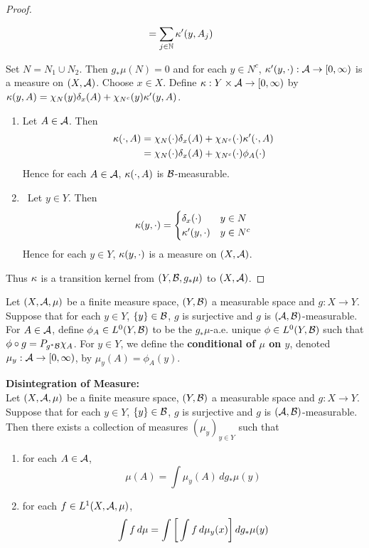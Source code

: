\documentclass{book}
\begin{document}
\begin{proof}
\begin{itemize}
\begin{align*}
				& =  \sum\limits_{j \in \mathbb{N}} \kappa'(y, A_j)
			\end{align*}
		\end{itemize}
		Set $N = N_1 \cup N_2$. Then $g_*\mu(N) = 0$ and for each $y \in N^c$, $\kappa'(y, \cdot): \mathcal{A} \rightarrow [0,\infty)$ is a measure on $(X, \mathcal{A})$. Choose $x \in X$. Define $\kappa: Y \times \mathcal{A} \rightarrow [0,\infty)$ by $\kappa (y, A) = \chi_{N}(y)\delta_{x}(A) + \chi_{N^c}(y)\kappa'(y, A)$. 
		\begin{enumerate}
			\item Let $A \in \mathcal{A}$. Then 
			\begin{align*}
				\kappa(\cdot, A) 
				& = \chi_N(\cdot) \delta_x(A) + \chi_{N^c}(\cdot) \kappa'(\cdot, A) \\ 
				& = \chi_N(\cdot) \delta_x(A) + \chi_{N^c}(\cdot) \phi_A(\cdot) 
			\end{align*}
			Hence for each $A \in \mathcal{A}$, $\kappa(\cdot, A)$ is $\mathcal{B}$-measurable.
			\item \
			Let $y \in Y$. Then 
			\[
			\kappa(y, \cdot) = 
			\begin{cases}
				\delta_x(\cdot) & y \in N \\
				\kappa'(y, \cdot) & y \in N^c \\
			\end{cases}
			\]
			Hence for each $y \in Y$, $\kappa(y, \cdot)$ is a measure on $(X, \mathcal{A})$. 
		\end{enumerate}
		Thus $\kappa$ is a transition kernel from $(Y, \mathcal{B}, g_*\mu)$ to $(X, \mathcal{A})$.
	\end{proof}
	
	\begin{defn}
		Let $(X, \mathcal{A}, \mu)$ be a finite measure space, $(Y, \mathcal{B})$ a measurable space and $g: X \rightarrow Y$. Suppose that for each $y \in Y$, $\{y\} \in \mathcal{B}$, $g$ is surjective and $g$ is $(\mathcal{A}, \mathcal{B})$-measurable. For $A \in \mathcal{A}$, define $\phi_A \in L^0(Y, \mathcal{B} )$ to be the $g_*\mu$-a.e. unique $\phi \in L^0(Y, \mathcal{B})$ such that $\phi \circ g = P_{g^*\mathcal{B}} \chi_A$. For $y \in Y$, we define the \textbf{conditional of $\mu$ on $y$}, denoted $\mu_y : \mathcal{A} \rightarrow [0,\infty)$, by $\mu_y(A) = \phi_A(y)$. 
	\end{defn}
	
	\begin{ex} \textbf{Disintegration of Measure:} \\
		Let $(X, \mathcal{A}, \mu)$ be a finite measure space, $(Y, \mathcal{B})$ a measurable space and $g: X \rightarrow Y$. Suppose that for each $y \in Y$, $\{y\} \in \mathcal{B}$, $g$ is surjective and $g$ is $(\mathcal{A}, \mathcal{B})$-measurable. Then there exists a collection of measures $(\mu_y)_{y \in Y}$ such that  
		\begin{enumerate}
			\item for each $A \in \mathcal{A}$, 
			$$\mu(A) = \int \mu_y(A) \, d g_*\mu(y) $$
			\item for each $f \in L^1(X, \mathcal{A}, \mu)$, 
			$$\int f \, d \mu = \int \bigg[ \int f \, d\mu_y(x) \bigg] \, d g_*\mu(y)$$ 
		\end{enumerate}
	\end{ex}
	
\end{document}
